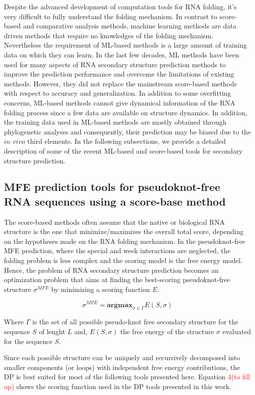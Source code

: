Despite the advanced development of computation tools for RNA folding, it's very difficult to fully understand the folding mechanism. In contrast to score-based and comparative analysis methods, machine learning methods are data driven methods that require no knowledges of the folding mechanism. Nevertheless the requirement of ML-based methods is a large amount of training data on which they can learn.  In the last few decades, ML methods have been used for many aspects of RNA secondary structure prediction methods to improve the prediction performance and overcome the limitations of existing methods. However, they did not replace the mainstream score-based methods with respect to accuracy and generalization. In addition to some overfitting concerns, ML-based methods cannot give dynamical information of the RNA folding process since a few data are available on structure dynamics. In addition, the training data used in ML-based methods are mostly obtained through phylogenetic analyses and consequently, their prediction may be biased due to the $in$ $vivo$ third elements.  In the following subsections, we provide a detailed description of some of the recent ML-based and score-based tools for secondary structure prediction.
\subsection{ MFE prediction tools for pseudoknot-free RNA sequences using a score-base method}
The score-based methods often assume that the native or biological RNA structure is the one that minimize/maximizes the overall total score, depending on the hypotheses made on the RNA folding mechanism. In the pseudoknot-free MFE prediction, where the special and week interactions are neglected, the folding problem is less complex and the scoring model is the free energy model. Hence, the problem of RNA secondary structure prediction becomes an optimization problem that aims at finding the best-scoring pseudoknot-free structure $\sigma^{MFE}$ by minimizing a scoring function $E$.

\begin{equation}
	\sigma^{MFE} =  \textbf{argmax}_{\sigma \in \Gamma} E(S, \sigma) 
\end{equation}

Where $\Gamma$ is the set of all possible pseudo-knot free secondary structure for the sequence $S$ of lenght $L$ and, $E(S, \sigma)$ the free energy of the structure $\sigma$ evaluated for the sequence $S$.

Since each possible structure can be uniquely and recursively decomposed into smaller components (or loops) with independent free energy contributions, the DP is best suited for most of the following tools presented here.
Equation \textcolor{red}{4(to fill up)}  shows the scoring function used in the DP tools presented in this work.

